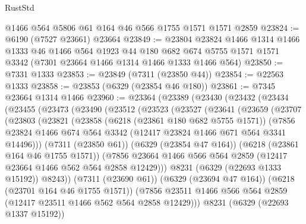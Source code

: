 \begin{lexlean}{RustStd}
\begin{coremodule}
{{    @1466
    @564
    @5806
    @61
    @164
    @46
    @566
    @1755
    @1571
    @1571
    @2859
@23824 := @6190 (@7527 @23661) @23664
@23849 := @23804
    @23824
    @1466
    @1314
    @1466
    @1333
    @46
    @1466
    @564
    @1923
    @44
    @180
    @682
    @674
    @5755
    @1571
    @1571
    @3342
    (@7301 @23664 @1466 @1314 @1466 @1333 @1466 @564)
@23850 := @7331 @1333
@23853 := @23849 (@7311 (@23850 @44))
@23854 := @22563 @1333
@23858 := @23853 (@6329 (@23854 @46 @180))
@23861 := @7345 @23664 @1314 @1466
@23960 := @23364
    (@23389
      (@23430
        (@23432
          (@23434
            (@23455
              (@23473
                (@23490
                  (@23512
                    (@23523
                      (@23527
                        (@23641
                          (@23659
                            (@23707
                              (@23803
                                (@23821
                                  (@23858
                                    (@6218 (@23861 @180 @682 @5755 @1571))
                                    (@7856
                                      @23824
                                      @1466
                                      @674
                                      @564
                                      @3342
                                      (@12417 @23824 @1466 @671 @564 @3341 @14496)))
                                  (@7311 (@23850 @61))
                                  (@6329 (@23854 @47 @164))
                                  (@6218 (@23861 @164 @46 @1755 @1571))
                                  (@7856
                                    @23664
                                    @1466
                                    @566
                                    @564
                                    @2859
                                    (@12417 @23664 @1466 @562 @564 @2858 @12429)))
                                @8231
                                (@6329 (@22693 @1333 @15192))
                                @8243))
                            (@7311 (@23690 @61))
                            (@6329 (@23694 @47 @164))
                            (@6218 (@23701 @164 @46 @1755 @1571))
                            (@7856
                              @23511
                              @1466
                              @566
                              @564
                              @2859
                              (@12417 @23511 @1466 @562 @564 @2858 @12429)))
                          @8231
                          (@6329 (@22693 @1337 @15192))
}}
\end{coremodule}
\end{lexlean}
